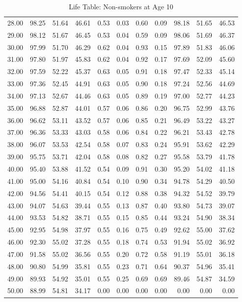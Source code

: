 \begin{table}[ht]
\begin{tabular}{rrrrrrrrrrr}
  28.00 & 98.25 & 51.64 & 46.61 & 0.53 & 0.03 & 0.60 & 0.09 & 98.18 & 51.65 & 46.53 \\ 
  29.00 & 98.12 & 51.67 & 46.45 & 0.53 & 0.04 & 0.59 & 0.09 & 98.06 & 51.69 & 46.37 \\ 
  30.00 & 97.99 & 51.70 & 46.29 & 0.62 & 0.04 & 0.93 & 0.15 & 97.89 & 51.83 & 46.06 \\ 
  31.00 & 97.80 & 51.97 & 45.83 & 0.62 & 0.04 & 0.92 & 0.17 & 97.69 & 52.09 & 45.60 \\ 
  32.00 & 97.59 & 52.22 & 45.37 & 0.63 & 0.05 & 0.91 & 0.18 & 97.47 & 52.33 & 45.14 \\ 
  33.00 & 97.36 & 52.45 & 44.91 & 0.63 & 0.05 & 0.90 & 0.18 & 97.24 & 52.56 & 44.69 \\ 
  34.00 & 97.13 & 52.67 & 44.46 & 0.63 & 0.05 & 0.89 & 0.19 & 97.00 & 52.77 & 44.23 \\ 
  35.00 & 96.88 & 52.87 & 44.01 & 0.57 & 0.06 & 0.86 & 0.20 & 96.75 & 52.99 & 43.76 \\ 
  36.00 & 96.62 & 53.11 & 43.52 & 0.57 & 0.06 & 0.85 & 0.21 & 96.49 & 53.22 & 43.27 \\ 
  37.00 & 96.36 & 53.33 & 43.03 & 0.58 & 0.06 & 0.84 & 0.22 & 96.21 & 53.43 & 42.78 \\ 
  38.00 & 96.07 & 53.53 & 42.54 & 0.58 & 0.07 & 0.83 & 0.24 & 95.91 & 53.62 & 42.29 \\ 
  39.00 & 95.75 & 53.71 & 42.04 & 0.58 & 0.08 & 0.82 & 0.27 & 95.58 & 53.79 & 41.78 \\ 
  40.00 & 95.40 & 53.88 & 41.52 & 0.54 & 0.09 & 0.91 & 0.30 & 95.20 & 54.02 & 41.18 \\ 
  41.00 & 95.00 & 54.16 & 40.84 & 0.54 & 0.10 & 0.90 & 0.34 & 94.78 & 54.29 & 40.50 \\ 
  42.00 & 94.56 & 54.41 & 40.15 & 0.54 & 0.12 & 0.88 & 0.38 & 94.32 & 54.52 & 39.79 \\ 
  43.00 & 94.07 & 54.63 & 39.44 & 0.55 & 0.13 & 0.87 & 0.40 & 93.80 & 54.73 & 39.07 \\ 
  44.00 & 93.53 & 54.82 & 38.71 & 0.55 & 0.15 & 0.85 & 0.44 & 93.24 & 54.90 & 38.34 \\ 
  45.00 & 92.95 & 54.98 & 37.97 & 0.55 & 0.16 & 0.75 & 0.49 & 92.62 & 55.00 & 37.62 \\ 
  46.00 & 92.30 & 55.02 & 37.28 & 0.55 & 0.18 & 0.74 & 0.53 & 91.94 & 55.02 & 36.92 \\ 
  47.00 & 91.58 & 55.02 & 36.56 & 0.55 & 0.20 & 0.72 & 0.58 & 91.19 & 55.01 & 36.18 \\ 
  48.00 & 90.80 & 54.99 & 35.81 & 0.55 & 0.23 & 0.71 & 0.64 & 90.37 & 54.96 & 35.41 \\ 
  49.00 & 89.93 & 54.92 & 35.01 & 0.55 & 0.25 & 0.69 & 0.69 & 89.46 & 54.87 & 34.59 \\ 
  50.00 & 88.99 & 54.81 & 34.17 & 0.00 & 0.00 & 0.00 & 0.00 & 0.00 & 0.00 & 0.00 \\ 
   \hline
\end{tabular}
\caption{Life Table: Non-smokers at Age 10} 
\end{table}
